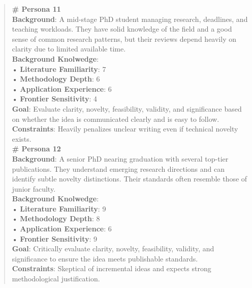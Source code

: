 \begin{quote}
\begin{tcolorbox}[breakable,colback=persona!20!white, colframe=persona!60!black, title=\textbf{Personas}]
        \textbf{\# Persona 11}\\
        \textbf{Background}: A mid-stage PhD student managing research, deadlines, and teaching workloads. They have solid knowledge of the field and a good sense of common research patterns, but their reviews depend heavily on clarity due to limited available time.\\
        \textbf{Background Knolwedge}:\\
        • \textbf{Literature Familiarity}: 7\\
        • \textbf{Methodology Depth}: 6\\
        • \textbf{Application Experience}: 6\\
        • \textbf{Frontier Sensitivity}: 4\\
        \textbf{Goal}: Evaluate clarity, novelty, feasibility, validity, and significance based on whether the idea is communicated clearly and is easy to follow.\\
        \textbf{Constraints}: Heavily penalizes unclear writing even if technical novelty exists.\\

        \textbf{\# Persona 12}\\
        \textbf{Background}: A senior PhD nearing graduation with several top-tier publications. They understand emerging research directions and can identify subtle novelty distinctions. Their standards often resemble those of junior faculty.\\
        \textbf{Background Knolwedge}:\\
        • \textbf{Literature Familiarity}: 9\\
        • \textbf{Methodology Depth}: 8\\
        • \textbf{Application Experience}: 6\\
        • \textbf{Frontier Sensitivity}: 9\\
        \textbf{Goal}: Critically evaluate clarity, novelty, feasibility, validity, and significance to ensure the idea meets publishable standards.\\
        \textbf{Constraints}: Skeptical of incremental ideas and expects strong methodological justification.\\


\end{tcolorbox}
\end{quote}
